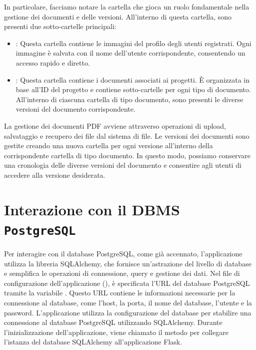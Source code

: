 \documentclass{report}
\begin{document}
In particolare, facciamo notare la cartella  che gioca un ruolo fondamentale nella gestione dei documenti e delle versioni. All'interno di questa cartella, sono presenti due sotto-cartelle principali:
\begin{itemize}
\item {}: Questa cartella contiene le immagini del profilo degli utenti registrati. Ogni immagine è salvata con il nome dell'utente corrispondente, consentendo un accesso rapido e diretto.

\item {}: Questa cartella contiene i documenti associati ai progetti. È organizzata in base all'ID del progetto e contiene sotto-cartelle per ogni tipo di documento. All'interno di ciascuna cartella di tipo documento, sono presenti le diverse versioni del documento corrispondente.
\end{itemize}
La gestione dei documenti PDF avviene attraverso operazioni di upload, salvataggio e recupero dei file dal sistema di file. Le versioni dei documenti sono gestite creando una nuova cartella per ogni versione all'interno della corrispondente cartella di tipo documento. In questo modo, possiamo conservare una cronologia delle diverse versioni del documento e consentire agli utenti di accedere alla versione desiderata.

\section{Interazione con il DBMS \texttt{PostgreSQL}}

Per interagire con il database PostgreSQL,  come già accennato,  l'applicazione utilizza la libreria SQLAlchemy, che fornisce un'astrazione del livello di database e semplifica le operazioni di connessione, query e gestione dei dati.
Nel file di configurazione dell'applicazione (), è specificata l'URL del database PostgreSQL tramite la variabile . Questo URL contiene le informazioni necessarie per la connessione al database, come l'host, la porta, il nome del database, l'utente e la password.
L'applicazione utilizza la configurazione del database per stabilire una connessione al database PostgreSQL utilizzando SQLAlchemy. Durante l'inizializzazione dell'applicazione, viene chiamato il metodo  per collegare l'istanza del database SQLAlchemy all'applicazione Flask.
\end{document}
